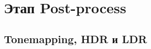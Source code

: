 \section{Этап Post-process} \label{ch3:post_process}
	\subsection{Tonemapping, HDR и LDR} \label{ch3:post_process:hdr_ldr_tonemapping}